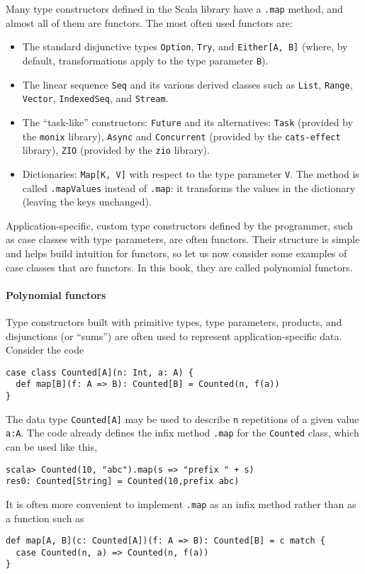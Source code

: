Many type constructors defined in the Scala library have a \lstinline!.map!
method, and almost all of them are functors. The most often used functors
are:
\begin{itemize}
\item The standard disjunctive types \lstinline!Option!, \lstinline!Try!,
and \lstinline!Either[A, B]! (where, by default, transformations
apply to the type parameter \lstinline!B!).
\item The linear sequence \lstinline!Seq! and its various derived classes
such as \lstinline!List!, \lstinline!Range!, \lstinline!Vector!,
\lstinline!IndexedSeq!, and \lstinline!Stream!.
\item The ``task-like'' constructors: \lstinline!Future! and its alternatives:
\lstinline!Task! (provided by the \texttt{monix} library), \lstinline!Async!
and \lstinline!Concurrent! (provided by the \texttt{cats-effect}
library), \lstinline!ZIO! (provided by the \texttt{zio} library).
\item Dictionaries: \lstinline!Map[K, V]! with respect to the type parameter
\lstinline!V!. The method is called \lstinline!.mapValues! instead
of \lstinline!.map!: it transforms the values in the dictionary (leaving
the keys unchanged).
\end{itemize}
Application-specific, custom type constructors defined by the programmer,
such as case classes with type parameters, are often functors. Their
structure is simple and helps build intuition for functors, so let
us now consider some examples of case classes that are functors. In
this book, they are called polynomial functors.

\paragraph{Polynomial functors}

Type constructors built with primitive types,
type parameters, products, and disjunctions (or ``sums'') are often
used to represent application-specific data. Consider the code
\begin{lstlisting}
case class Counted[A](n: Int, a: A) {
  def map[B](f: A => B): Counted[B] = Counted(n, f(a))
}
\end{lstlisting}
The data type \lstinline!Counted[A]! may be used to describe \lstinline!n!
repetitions of a given value \lstinline!a:A!. The code already defines
the infix method \lstinline!.map! for the \lstinline!Counted! class,
which can be used like this,
\begin{lstlisting}
scala> Counted(10, "abc").map(s => "prefix " + s)
res0: Counted[String] = Counted(10,prefix abc) 
\end{lstlisting}
It is often more convenient to implement \lstinline!.map! as an infix
method rather than as a function such as
\begin{lstlisting}
def map[A, B](c: Counted[A])(f: A => B): Counted[B] = c match {
  case Counted(n, a) => Counted(n, f(a))
}
\end{lstlisting}

